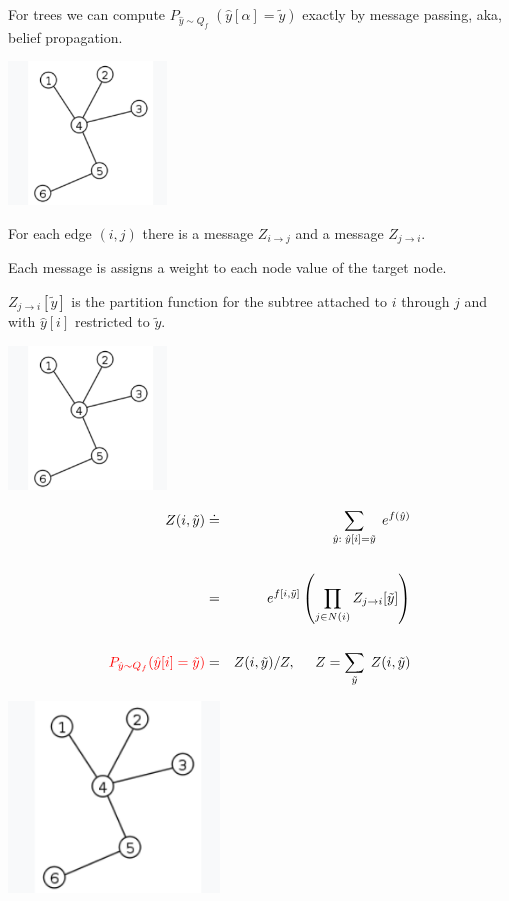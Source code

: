 {\vfill
For trees we can compute $P_{\hat{y} \sim Q_f}\;(\hat{y}[\alpha] = \tilde{y})$ exactly by message passing, aka, belief propagation.


\centerline{\includegraphics[height=1.5in]{../images/Tree}}

\vfill
For each edge $(i,j)$ there is a message $Z_{i \rightarrow j}$ and a message $Z_{j \rightarrow i}$.

\vfill
Each message is assigns a weight to each node value of the target node.


\vfill
$Z_{j \rightarrow i}[\tilde{y}]$ is the partition function for the subtree attached to $i$ through $j$ and
with $\hat{y}[i]$ restricted to $\tilde{y}$.


\centerline{\includegraphics[height=1.5in]{../images/Tree}}

\begin{eqnarray*}
Z(i,\tilde{y}) & \doteq & \sum_{\hat{y}:\; \hat{y}[i] = \tilde{y}} \;e^{f(\hat{y})} \\
\\
& = & e^{f[i,\tilde{y}]} \left(\prod_{j\in N(i)} Z_{j \rightarrow i}[\tilde{y}]\right) \\
\\
{\color{red} P_{\hat{y}\sim Q_f}(\hat{y}[i] = \tilde{y})} & = & Z(i,\tilde{y})/Z,\;\;\;\;\; Z = \sum_{\tilde{y}}\;Z(i,\tilde{y})
\end{eqnarray*}



\centerline{\includegraphics[height=2.0in]{../images/Tree}}

}
